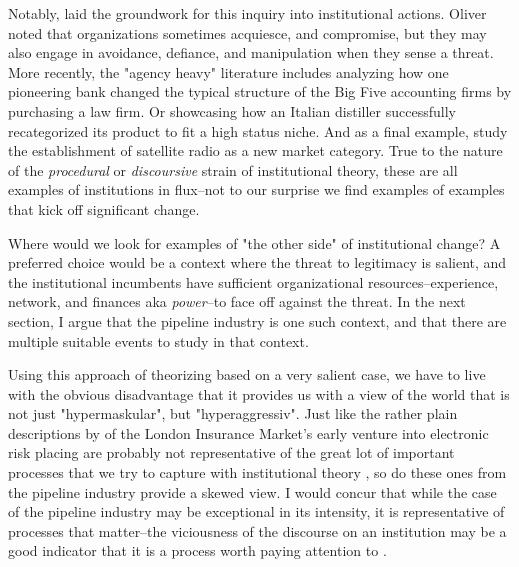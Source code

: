Notably, \citet{Oliver1991} laid the groundwork for this inquiry into institutional actions. Oliver noted that organizations sometimes acquiesce, and compromise, but they may also engage in avoidance, defiance, and manipulation when they sense a threat. More recently, the "agency heavy" literature includes \citet{Suddaby2005} analyzing how one pioneering bank changed the typical structure of the Big Five accounting firms by purchasing a law firm. Or \citet{Delmestri2016} showcasing how an Italian distiller successfully recategorized its product to fit a high status niche. And as a final example, \citet{Navis2010} study the establishment of satellite radio as a new market category. True to the nature of the \textit{procedural} or \textit{discoursive} strain of institutional theory, these are all examples of institutions in flux--not to our surprise we find examples of examples that kick off significant change.

Where would we look for examples of "the other side" of institutional change? A preferred choice would be a context where the threat to legitimacy is salient, and the institutional incumbents have sufficient organizational resources--experience, network, and finances aka \textit{power}--to face off against the threat. In the next section, I argue that the pipeline industry is one such context, and that there are multiple suitable events to study in that context. 

Using this approach of theorizing based on a very salient case, we have to live with the obvious disadvantage that it provides us with a view of the world that is not just "hypermaskular", but "hyperaggressiv". Just like the rather plain descriptions by \citet{Heracleous2001} of the London Insurance Market's early venture into electronic risk placing are probably not representative of the great lot of important processes that we try to capture with institutional theory \citep{Hoffman2015}, so do these ones from the pipeline industry provide a skewed view. I would concur that while the case of the pipeline industry may be exceptional in its intensity, it is representative of processes that matter--the viciousness of the discourse on an institution may be a good indicator that it is a process worth paying attention to \citep[cf.][]{Ergene2020}.
